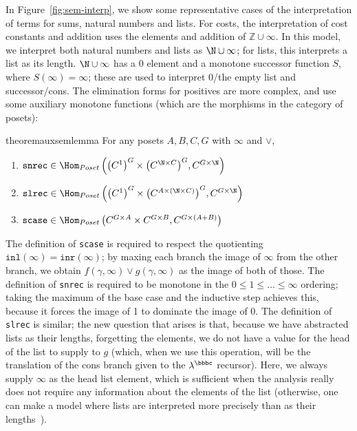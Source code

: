 In Figure~\ref{fig:sem-interp}, we show some representative cases of the
interpretation of terms for sums, natural numbers and lists.  For costs,
the interpretation of cost constants and addition uses the elements and
addition of $\mathbb{Z} \cup \infty$.
In this model, we interpret both natural numbers and
lists as $\N \cup \infty$; for lists, this interprets a list as its
length.  $\N \cup \infty$ has a 0 element and a monotone successor
function $S$, where $S(\infty) = \infty$; these are used to interpret
0/the empty list and successor/cons.
The elimination forms for positives are more complex, and use some
auxiliary monotone functions (which are the morphisms in the category of
posets):
\begin{restatable}{theorem}{auxsemlemma}\label{thm:aux-sem-lemma}
For any posets $A,B,C,G$ with $\infty$ and $\vee$,
\begin{enumerate}
  \item $\texttt{snrec} \in \Hom_{Poset}\left({\left(C^1\right)}^G\times {\left(C^{\N\times C}\right)}^G,C^{G\times\N}\right)$
  \item $\texttt{slrec} \in  \Hom_{Poset}\left({\left(C^1\right)^G} \times {\left(C^{A \times (\N \times C)}\right)^G},C^{G \times \N}\right)$
  \item $\texttt{scase} \in \Hom_{Poset}\left(C^{G \times A}\times C^{G \times B},C^{G\times(A + B)}\right)$
\end{enumerate}
\end{restatable}


The definition of \texttt{scase} is required to respect the quotienting
$\texttt{inl}(\infty) = \texttt{inr}(\infty)$; by maxing each branch the
image of $\infty$ from the other branch, we obtain $f(\gamma,\infty)
\vee g(\gamma,\infty)$ as the image of both of those.  The definition of
\texttt{snrec} is required to be monotone in the $0 \le 1 \le \ldots \le
\infty$ ordering; taking the maximum of the base case and the inductive
step achieves this, because it forces the image of 1 to dominate the
image of 0.  The definition of \texttt{slrec} is similar; the new
question that arises is that, because we have abstracted lists as their
lengths, forgetting the elements, we do not have a value for the head of
the list to supply to $g$ (which, when we use this operation, will be
the translation of the cons branch given to the $\lambda^\bbbc$
recursor).  Here, we always supply $\infty$ as the head list element,
which is sufficient when the analysis really does not require any
information about the elements of the list (otherwise, one can make a
model where lists are interpreted more precisely than as their
lengths~\cite{danner-et-al:icfp15,danner-licata:jfp-in-prep}).

